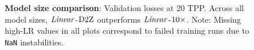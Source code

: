 \begin{figure}
  \centering
  \mbox{}
  \vspace{-4mm}
  \mbox{}
  \caption{\textbf{Model size comparison}: Validation losses at 20
    TPP\@.
    Across all model sizes, $\mbox{\emph{Linear}}$-$\mbox{D2Z}$ outperforms
    $\mbox{\emph{Linear}}$-$\mbox{10}\times$. Note: Missing high-LR values in all plots
    correspond to failed training runs due to \texttt{NaN}
    instabilities.\label{fig:maxlr_tpp:models}}
\end{figure}
